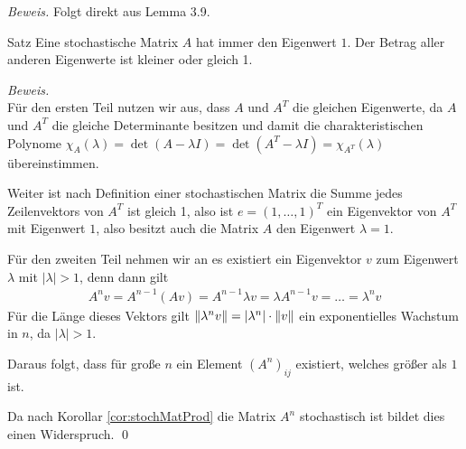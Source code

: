 \textit{Beweis.} Folgt direkt aus Lemma 3.9.

\begin{colbox}{Satz}
  Eine stochastische Matrix $A$ hat immer den Eigenwert $1$. Der Betrag aller anderen Eigenwerte ist
  kleiner oder gleich 1.
\end{colbox}
\textit{Beweis.} \\
Für den ersten Teil nutzen wir aus, dass $A$ und $A^T$ die gleichen Eigenwerte, da $A$ und $A^T$ die 
gleiche Determinante besitzen und damit die charakteristischen Polynome $\chi_A(\lambda) = \det(A-\lambda I) 
= \det(A^T-\lambda I) = \chi_{A^T}(\lambda)$ übereinstimmen. 

Weiter ist nach Definition einer stochastischen Matrix die Summe jedes Zeilenvektors von $A^T$ ist gleich 1,
also ist $e=(1,\dots,1)^T$ ein Eigenvektor von $A^T$ mit Eigenwert $1$, also besitzt auch die Matrix $A$ den 
Eigenwert $\lambda = 1$. 

Für den zweiten Teil nehmen wir an es existiert ein Eigenvektor $v$ zum Eigenwert $\lambda$ mit $|\lambda|>1$, 
denn dann gilt 
%
\begin{align*}
  A^n v = A^{n-1}(Av) = A^{n-1}\lambda v = \lambda A^{n-1}v = \dots = \lambda^n v
\end{align*}
%
Für die Länge dieses Vektors gilt $\vertn{2}{\lambda^n v} = |\lambda^n|\cdot \vertn{2}{v}$ ein 
exponentielles Wachstum in $n$, da $|\lambda|>1$. 

Daraus folgt, dass für große $n$ ein Element $(A^n)_{ij}$ existiert, welches größer als $1$ ist.

Da nach Korollar \ref{cor:stochMatProd} die Matrix $A^n$ stochastisch ist bildet dies einen Widerspruch.
\qed


